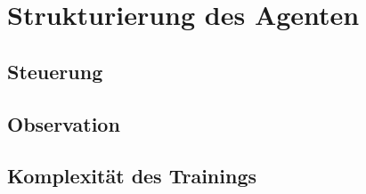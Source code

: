\newpage
\section{Strukturierung des Agenten}
\subsection{Steuerung}
\subsection{Observation}
\subsection{Komplexität des Trainings}
